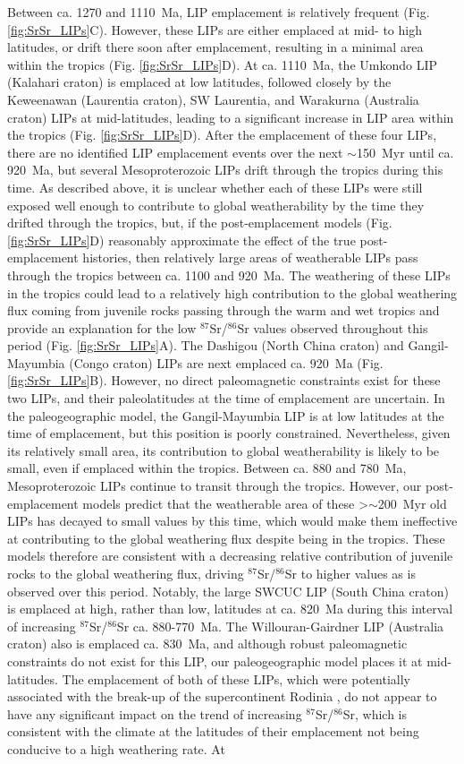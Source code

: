 \documentclass[11pt,letterpaper]{article}
\newcommand{\SrSr}{$^{87}$Sr/$^{86}$Sr\xspace}
\begin{document}
Between ca. 1270 and 1110~Ma, LIP emplacement is relatively frequent (Fig. \ref{fig:SrSr_LIPs}C). However, these LIPs are either emplaced at mid- to high latitudes, or drift there soon after emplacement, resulting in a minimal area within the tropics (Fig. \ref{fig:SrSr_LIPs}D). At ca. 1110~Ma, the Umkondo LIP (Kalahari craton) is emplaced at low latitudes, followed closely by the Keweenawan (Laurentia craton), SW Laurentia, and Warakurna (Australia craton) LIPs at mid-latitudes, leading to a significant increase in LIP area within the tropics (Fig. \ref{fig:SrSr_LIPs}D). After the emplacement of these four LIPs, there are no identified LIP emplacement events over the next $\sim$150~Myr until ca. 920~Ma, but several Mesoproterozoic LIPs drift through the tropics during this time. As described above, it is unclear whether each of these LIPs were still exposed well enough to contribute to global weatherability by the time they drifted through the tropics, but, if the post-emplacement models (Fig. \ref{fig:SrSr_LIPs}D) reasonably approximate the effect of the true post-emplacement histories, then relatively large areas of weatherable LIPs pass through the tropics between ca. 1100 and 920~Ma. The weathering of these LIPs in the tropics could lead to a relatively high contribution to the global weathering flux coming from juvenile rocks passing through the warm and wet tropics and provide an explanation for the low \SrSr values observed throughout this period (Fig. \ref{fig:SrSr_LIPs}A). The Dashigou (North China craton) and Gangil-Mayumbia (Congo craton) LIPs are next emplaced ca. 920~Ma (Fig. \ref{fig:SrSr_LIPs}B). However, no direct paleomagnetic constraints exist for these two LIPs, and their paleolatitudes at the time of emplacement are uncertain. In the paleogeographic model, the Gangil-Mayumbia LIP is at low latitudes at the time of emplacement, but this position is poorly constrained. Nevertheless, given its relatively small area, its contribution to global weatherability is likely to be small, even if emplaced within the tropics. Between ca. 880 and 780~Ma, Mesoproterozoic LIPs continue to transit through the tropics. However, our post-emplacement models predict that the weatherable area of these \textgreater$\sim$200~Myr old LIPs has decayed to small values by this time, which would make them ineffective at contributing to the global weathering flux despite being in the tropics. These models therefore are consistent with a decreasing relative contribution of juvenile rocks to the global weathering flux, driving \SrSr to higher values as is observed over this period. Notably, the large SWCUC LIP (South China craton) is emplaced at high, rather than low, latitudes at ca. 820~Ma during this interval of increasing \SrSr ca. 880-770~Ma. The Willouran-Gairdner LIP (Australia craton) also is emplaced ca. 830~Ma, and although robust paleomagnetic constraints do not exist for this LIP, our paleogeographic model places it at mid-latitudes. The emplacement of both of these LIPs, which were potentially associated with the break-up of the supercontinent Rodinia \citep{Ernst2008a}, do not appear to have any significant impact on the trend of increasing \SrSr, which is consistent with the climate at the latitudes of their emplacement not being conducive to a high weathering rate. At 
\end{document}
